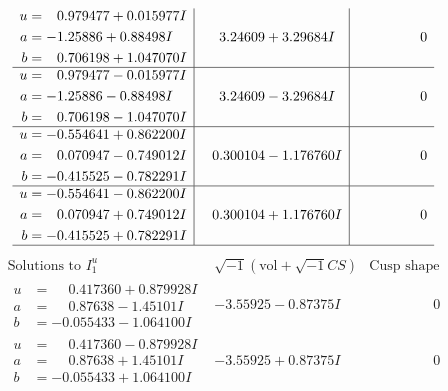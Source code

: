 \documentclass[1p]{elsarticle_modified}
\theoremstyle{definition}
\newcommand{\I}{\sqrt{-1}}
\begin{document}
$$\begin{array}{c|c|c}
\begin{aligned}
u &= \phantom{-}0.979477 + 0.015977 I \\
a &= -1.25886 + 0.88498 I \\
b &= \phantom{-}0.706198 + 1.047070 I\end{aligned}
 & \phantom{-}3.24609 + 3.29684 I & \phantom{-0.000000 } 0 \\ \hline\begin{aligned}
u &= \phantom{-}0.979477 - 0.015977 I \\
a &= -1.25886 - 0.88498 I \\
b &= \phantom{-}0.706198 - 1.047070 I\end{aligned}
 & \phantom{-}3.24609 - 3.29684 I & \phantom{-0.000000 } 0 \\ \hline\begin{aligned}
u &= -0.554641 + 0.862200 I \\
a &= \phantom{-}0.070947 - 0.749012 I \\
b &= -0.415525 - 0.782291 I\end{aligned}
 & \phantom{-}0.300104 - 1.176760 I & \phantom{-0.000000 } 0 \\ \hline\begin{aligned}
u &= -0.554641 - 0.862200 I \\
a &= \phantom{-}0.070947 + 0.749012 I \\
b &= -0.415525 + 0.782291 I\end{aligned}
 & \phantom{-}0.300104 + 1.176760 I & \phantom{-0.000000 } 0\\
 \hline 
 \end{array}$$\newpage$$\begin{array}{c|c|c}  
\text{Solutions to }I^u_{1}& \I (\text{vol} + \sqrt{-1}CS) & \text{Cusp shape}\\
 \hline 
\begin{aligned}
u &= \phantom{-}0.417360 + 0.879928 I \\
a &= \phantom{-}0.87638 - 1.45101 I \\
b &= -0.055433 - 1.064100 I\end{aligned}
 & -3.55925 - 0.87375 I & \phantom{-0.000000 } 0 \\ \hline\begin{aligned}
u &= \phantom{-}0.417360 - 0.879928 I \\
a &= \phantom{-}0.87638 + 1.45101 I \\
b &= -0.055433 + 1.064100 I\end{aligned}
 & -3.55925 + 0.87375 I & \phantom{-0.000000 } 0 \\ \hline\begin{aligned}

\end{aligned}
\end{array}$$
\end{document}
